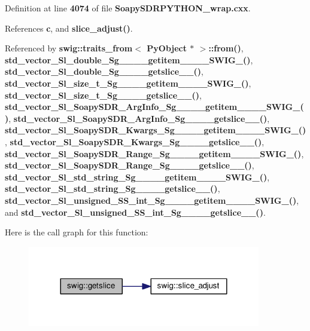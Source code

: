 Definition at line {\bf 4074} of file {\bf Soapy\+S\+D\+R\+P\+Y\+T\+H\+O\+N\+\_\+wrap.\+cxx}.



References {\bf c}, and {\bf slice\+\_\+adjust()}.



Referenced by {\bf swig\+::traits\+\_\+from$<$ Py\+Object $\ast$ $>$\+::from()}, {\bf std\+\_\+vector\+\_\+\+Sl\+\_\+double\+\_\+\+Sg\+\_\+\+\_\+\+\_\+\+\_\+getitem\+\_\+\+\_\+\+\_\+\+\_\+\+S\+W\+I\+G\+\_()}, {\bf std\+\_\+vector\+\_\+\+Sl\+\_\+double\+\_\+\+Sg\+\_\+\+\_\+\+\_\+\+\_\+getslice\+\_\+\+\_\+()}, {\bf std\+\_\+vector\+\_\+\+Sl\+\_\+size\+\_\+t\+\_\+\+Sg\+\_\+\+\_\+\+\_\+\+\_\+getitem\+\_\+\+\_\+\+\_\+\+\_\+\+S\+W\+I\+G\+\_()}, {\bf std\+\_\+vector\+\_\+\+Sl\+\_\+size\+\_\+t\+\_\+\+Sg\+\_\+\+\_\+\+\_\+\+\_\+getslice\+\_\+\+\_\+()}, {\bf std\+\_\+vector\+\_\+\+Sl\+\_\+\+Soapy\+S\+D\+R\+\_\+\+Arg\+Info\+\_\+\+Sg\+\_\+\+\_\+\+\_\+\+\_\+getitem\+\_\+\+\_\+\+\_\+\+\_\+\+S\+W\+I\+G\+\_()}, {\bf std\+\_\+vector\+\_\+\+Sl\+\_\+\+Soapy\+S\+D\+R\+\_\+\+Arg\+Info\+\_\+\+Sg\+\_\+\+\_\+\+\_\+\+\_\+getslice\+\_\+\+\_\+()}, {\bf std\+\_\+vector\+\_\+\+Sl\+\_\+\+Soapy\+S\+D\+R\+\_\+\+Kwargs\+\_\+\+Sg\+\_\+\+\_\+\+\_\+\+\_\+getitem\+\_\+\+\_\+\+\_\+\+\_\+\+S\+W\+I\+G\+\_()}, {\bf std\+\_\+vector\+\_\+\+Sl\+\_\+\+Soapy\+S\+D\+R\+\_\+\+Kwargs\+\_\+\+Sg\+\_\+\+\_\+\+\_\+\+\_\+getslice\+\_\+\+\_\+()}, {\bf std\+\_\+vector\+\_\+\+Sl\+\_\+\+Soapy\+S\+D\+R\+\_\+\+Range\+\_\+\+Sg\+\_\+\+\_\+\+\_\+\+\_\+getitem\+\_\+\+\_\+\+\_\+\+\_\+\+S\+W\+I\+G\+\_()}, {\bf std\+\_\+vector\+\_\+\+Sl\+\_\+\+Soapy\+S\+D\+R\+\_\+\+Range\+\_\+\+Sg\+\_\+\+\_\+\+\_\+\+\_\+getslice\+\_\+\+\_\+()}, {\bf std\+\_\+vector\+\_\+\+Sl\+\_\+std\+\_\+string\+\_\+\+Sg\+\_\+\+\_\+\+\_\+\+\_\+getitem\+\_\+\+\_\+\+\_\+\+\_\+\+S\+W\+I\+G\+\_()}, {\bf std\+\_\+vector\+\_\+\+Sl\+\_\+std\+\_\+string\+\_\+\+Sg\+\_\+\+\_\+\+\_\+\+\_\+getslice\+\_\+\+\_\+()}, {\bf std\+\_\+vector\+\_\+\+Sl\+\_\+unsigned\+\_\+\+S\+S\+\_\+int\+\_\+\+Sg\+\_\+\+\_\+\+\_\+\+\_\+getitem\+\_\+\+\_\+\+\_\+\+\_\+\+S\+W\+I\+G\+\_()}, and {\bf std\+\_\+vector\+\_\+\+Sl\+\_\+unsigned\+\_\+\+S\+S\+\_\+int\+\_\+\+Sg\+\_\+\+\_\+\+\_\+\+\_\+getslice\+\_\+\+\_\+()}.



Here is the call graph for this function\+:
\nopagebreak
\begin{figure}[H]
\begin{center}
\leavevmode
\includegraphics[width=288pt]{d3/d99/namespaceswig_aea6eea14db6cc8782b9ddb680a0ae487_cgraph}
\end{center}
\end{figure}





